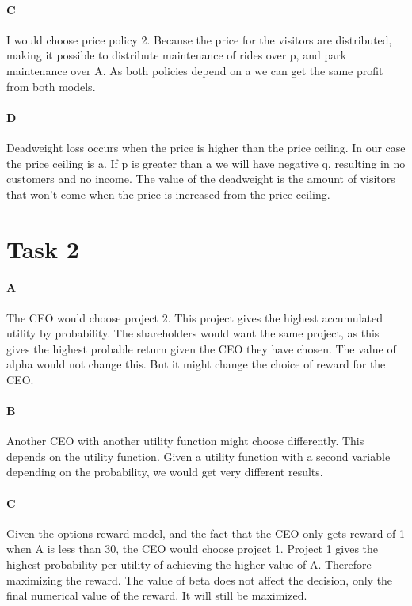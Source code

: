 \documentclass[12pt, a4paper]{article}
\begin{document}
\paragraph{C}
I would choose price policy 2. Because the price for the visitors are
distributed, making it possible to distribute maintenance of rides over p, and
park maintenance over A. As both policies depend on a we can get the same
profit from both models.

\paragraph{D}
Deadweight loss occurs when the price is higher than the price ceiling. In our
case the price ceiling is a. If p is greater than a we will have negative q,
resulting in no customers and no income. The value of the deadweight is the
amount of visitors that won't come when the price is increased from the price
ceiling. 

\section{Task 2}
\paragraph{A}
The CEO would choose project 2. This project gives the highest accumulated
utility by probability. The shareholders would want the same project, as this
gives the highest probable return given the CEO they have chosen. The value of
alpha would not change this. But it might change the choice of reward for the
CEO. 

\paragraph{B}
Another CEO with another utility function might choose differently. This
depends on the utility function. Given a utility function with a second
variable depending on the probability, we would get very different  results. 

\paragraph{C}
Given the options reward model, and the fact that the CEO only gets reward of 1
when A is less than 30, the CEO would choose project 1. Project 1 gives the
highest probability per utility of achieving the higher value of A. Therefore
maximizing the reward. The value of beta does not affect the decision, only the
final numerical value of the reward. It will still be maximized. 
\end{document}

